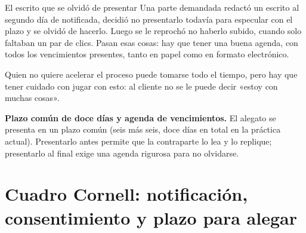 \documentclass[12pt,oneside]{book}
\begin{document}
\begin{example}{El escrito que se olvidó de presentar}
Una parte demandada redactó un escrito al segundo día de notificada, decidió no presentarlo todavía para especular con el plazo y se olvidó de hacerlo. Luego se le reprochó no haberlo subido, cuando solo faltaban un par de clics. Pasan esas cosas: hay que tener una buena agenda, con todos los vencimientos presentes, tanto en papel como en formato electrónico.
\end{example}

Quien no quiere acelerar el proceso puede tomarse todo el tiempo, pero hay que tener cuidado con jugar con esto: al cliente no se le puede decir «estoy con muchas cosas».

\begin{important}
\textbf{Plazo común de doce días y agenda de vencimientos.} El alegato se presenta en un plazo común (seis más seis, doce días en total en la práctica actual). Presentarlo antes permite que la contraparte lo lea y lo replique; presentarlo al final exige una agenda rigurosa para no olvidarse.
\end{important}

\section{Cuadro Cornell: notificación, consentimiento y plazo para alegar}
\end{document}
